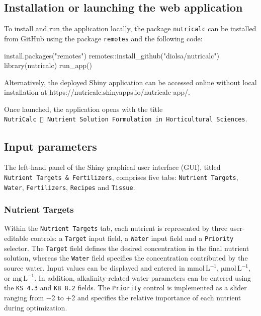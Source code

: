 \documentclass[
  letterpaper,
  DIV=11,
  numbers=noendperiod]{scrreprt}
\newenvironment{Shaded}{\begin{snugshade}}{\end{snugshade}}
\newcommand{\FunctionTok}[1]{\textcolor[rgb]{0.28,0.35,0.67}{#1}}
\newcommand{\NormalTok}[1]{\textcolor[rgb]{0.00,0.23,0.31}{#1}}
\newcommand{\SpecialCharTok}[1]{\textcolor[rgb]{0.37,0.37,0.37}{#1}}
\newcommand{\StringTok}[1]{\textcolor[rgb]{0.13,0.47,0.30}{#1}}
\begin{document}
\subsection{Installation or launching the web
application}\label{installation-or-launching-the-web-application}

To install and run the application locally, the package
\texttt{nutricalc} can be installed from GitHub using the package
\texttt{remotes} and the following code:

\begin{Shaded}
\begin{Highlighting}[]
\FunctionTok{install.packages}\NormalTok{(}\StringTok{"remotes"}\NormalTok{)}
\NormalTok{remotes}\SpecialCharTok{::}\FunctionTok{install\_github}\NormalTok{(}\StringTok{"diolsa/nutricalc"}\NormalTok{)}
\FunctionTok{library}\NormalTok{(nutricalc)}
\FunctionTok{run\_app}\NormalTok{()}
\end{Highlighting}
\end{Shaded}

Alternatively, the deployed Shiny application can be accessed online
without local installation at
https://nutricalc.shinyapps.io/nutricalc-app/.

Once launched, the application opens with the title
\texttt{NutriCalc\ 🌿\ Nutrient\ Solution\ Formulation\ in\ Horticultural\ Sciences}.

\subsection{Input parameters}\label{input-parameters}

The left-hand panel of the Shiny graphical user interface (GUI), titled
\texttt{Nutrient\ Targets\ \&\ Fertilizers}, comprises five tabs:
\texttt{Nutrient\ Targets}, \texttt{Water}, \texttt{Fertilizers},
\texttt{Recipes} and \texttt{Tissue}.

\subsubsection{Nutrient Targets}\label{nutrient-targets}

Within the \texttt{Nutrient\ Targets} tab, each nutrient is represented
by three user-editable controls: a \texttt{Target} input field, a
\texttt{Water} input field and a \texttt{Priority} selector. The
\texttt{Target} field defines the desired concentration in the final
nutrient solution, whereas the \texttt{Water} field specifies the
concentration contributed by the source water. Input values can be
displayed and entered in \(\mathrm{mmol\,L^{-1}}\),
\(\mathrm{\mu mol\,L^{-1}}\), or \(\mathrm{mg\,L^{-1}}\). In addition,
alkalinity-related water parameters can be entered using the
\texttt{KS\ 4.3} and \texttt{KB\ 8.2} fields. The \texttt{Priority}
control is implemented as a slider ranging from −2 to +2 and specifies
the relative importance of each nutrient during optimization.
\end{document}

